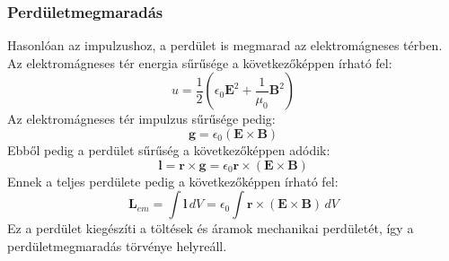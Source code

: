 \documentclass[../main.tex]{subfiles}
\begin{document}
\subsubsection*{Perdületmegmaradás}
Hasonlóan az impulzushoz, a perdület is megmarad az elektromágneses térben. Az elektromágneses tér energia sűrűsége a következőképpen írható fel:
\begin{equation}
    u = \frac{1}{2} \left( \epsilon_0 \mathbf{E}^2 + \frac{1}{\mu_0} \mathbf{B}^2 \right)
\end{equation}
Az elektromágneses tér impulzus sűrűsége pedig:
\begin{equation}
    \mathbf{g} = \epsilon_0 (\mathbf{E} \times \mathbf{B})
\end{equation}
Ebből pedig a perdület sűrűség a következőképpen adódik:
\begin{equation}
    \mathbf{l} = \mathbf{r} \times \mathbf{g} = \epsilon_0 \mathbf{r} \times (\mathbf{E} \times \mathbf{B})
\end{equation}
Ennek a teljes perdülete pedig a következőképpen írható fel:
\begin{equation}
    \mathbf{L}_{em} = \int \mathbf{l} \, dV = \epsilon_0 \int \mathbf{r} \times (\mathbf{E} \times \mathbf{B}) \, dV
\end{equation}
Ez a perdület kiegészíti a töltések és áramok mechanikai perdületét, így a perdületmegmaradás törvénye helyreáll.
\end{document}
